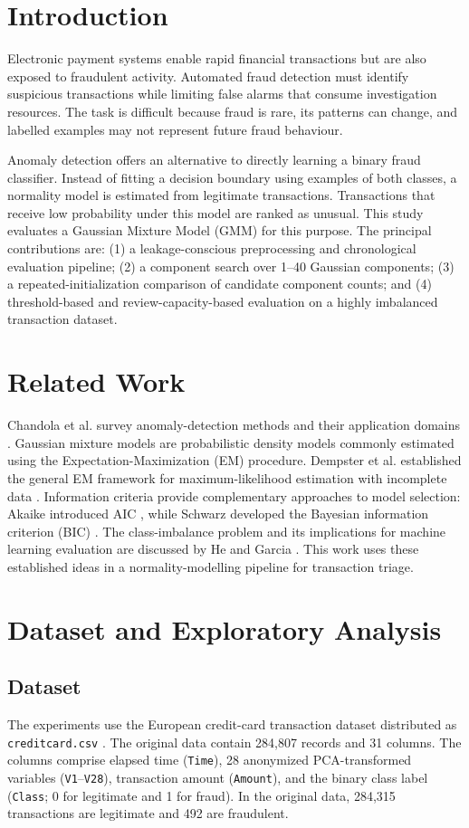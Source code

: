 \documentclass[conference]{IEEEtran}
\begin{document}
\section{Introduction}
Electronic payment systems enable rapid financial transactions but are also exposed to fraudulent activity. Automated fraud detection must identify suspicious transactions while limiting false alarms that consume investigation resources. The task is difficult because fraud is rare, its patterns can change, and labelled examples may not represent future fraud behaviour.

Anomaly detection offers an alternative to directly learning a binary fraud classifier. Instead of fitting a decision boundary using examples of both classes, a normality model is estimated from legitimate transactions. Transactions that receive low probability under this model are ranked as unusual. This study evaluates a Gaussian Mixture Model (GMM) for this purpose. The principal contributions are: (1) a leakage-conscious preprocessing and chronological evaluation pipeline; (2) a component search over 1--40 Gaussian components; (3) a repeated-initialization comparison of candidate component counts; and (4) threshold-based and review-capacity-based evaluation on a highly imbalanced transaction dataset.

\section{Related Work}
Chandola et al. survey anomaly-detection methods and their application domains \cite{chandola2009}. Gaussian mixture models are probabilistic density models commonly estimated using the Expectation-Maximization (EM) procedure. Dempster et al. established the general EM framework for maximum-likelihood estimation with incomplete data \cite{dempster1977}. Information criteria provide complementary approaches to model selection: Akaike introduced AIC \cite{akaike1974}, while Schwarz developed the Bayesian information criterion (BIC) \cite{schwarz1978}. The class-imbalance problem and its implications for machine learning evaluation are discussed by He and Garcia \cite{he2009}. This work uses these established ideas in a normality-modelling pipeline for transaction triage.

\section{Dataset and Exploratory Analysis}
\subsection{Dataset}
The experiments use the European credit-card transaction dataset distributed as \texttt{creditcard.csv} \cite{ulb_dataset}. The original data contain 284,807 records and 31 columns. The columns comprise elapsed time (\texttt{Time}), 28 anonymized PCA-transformed variables (\texttt{V1}--\texttt{V28}), transaction amount (\texttt{Amount}), and the binary class label (\texttt{Class}; 0 for legitimate and 1 for fraud). In the original data, 284,315 transactions are legitimate and 492 are fraudulent.
\end{document}
